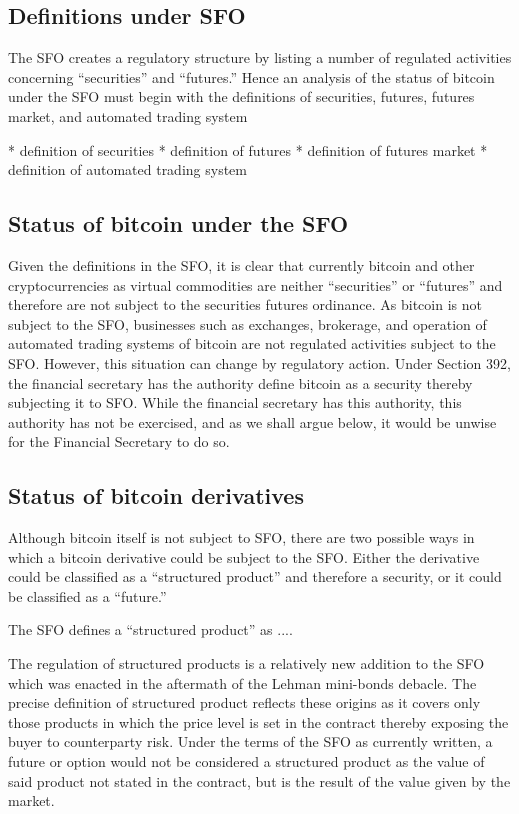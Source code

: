 \subsection{Definitions under SFO}

The SFO creates a regulatory structure by listing a number of
regulated activities concerning ``securities'' and ``futures.''  Hence
an analysis of the status of bitcoin under the SFO must begin with the
definitions of securities, futures, futures market, and automated
trading system

* definition of securities
* definition of futures
* definition of futures market
* definition of automated trading system

\subsection{Status of bitcoin under the SFO}

Given the definitions in the SFO, it is clear that currently bitcoin
and other cryptocurrencies as virtual commodities are neither
``securities'' or ``futures'' and therefore are not subject to the
securities futures ordinance.  As bitcoin is not subject to the SFO,
businesses such as exchanges, brokerage, and operation of automated
trading systems of bitcoin are not regulated activities subject to the
SFO.  However, this situation can change by regulatory action.  Under
Section 392, the financial secretary has the authority define bitcoin
as a security thereby subjecting it to SFO.  While the financial
secretary has this authority, this authority has not be exercised, and
as we shall argue below, it would be unwise for the Financial
Secretary to do so.

\subsection{Status of bitcoin derivatives}
Although bitcoin itself is not subject to SFO, there are two possible
ways in which a bitcoin derivative could be subject to the SFO.
Either the derivative could be classified as a ``structured product''
and therefore a security, or it could be classified as a ``future.''

The SFO defines a ``structured product'' as ....

The regulation of structured products is a relatively new addition to
the SFO which was enacted in the aftermath of the Lehman mini-bonds
debacle.  The precise definition of structured product reflects these
origins as it covers only those products in which the price level is
set in the contract thereby exposing the buyer to counterparty risk.
Under the terms of the SFO as currently written, a future or option
would not be considered a structured product as the value of said
product not stated in the contract, but is the result of the value
given by the market.

